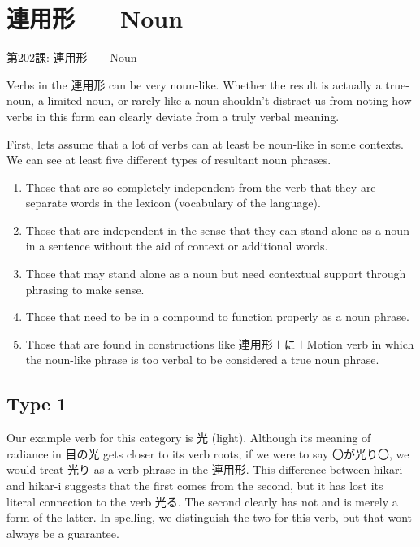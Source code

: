     
\chapter{連用形　\textrightarrow 　Noun}

\begin{center}
\begin{Large}
第202課: 連用形　\textrightarrow 　Noun 
\end{Large}
\end{center}
 
\par{ Verbs in the 連用形 can be very noun-like. Whether the result is actually a true-noun, a limited noun, or rarely like a noun shouldn't distract us from noting how verbs in this form can clearly deviate from a truly verbal meaning. }

\par{ First, let\textquotesingle s assume that a lot of verbs can at least be noun-like in some contexts. We can see at least five different types of resultant noun phrases. }

\begin{enumerate}

\item  Those that are so completely independent from the verb that they are separate words in the lexicon (vocabulary of the language). 
\item Those that are independent in the sense that they can stand alone as a noun in a sentence without the aid of context or additional words. \hfill\break

\item Those that may stand alone as a noun but need contextual support through phrasing to make sense. 
\item Those that need to be in a compound to function properly as a noun phrase. 
\item Those that are found in constructions like 連用形＋に＋Motion verb in which the noun-like phrase is too verbal to be considered a true noun phrase. 
\end{enumerate}
      
\section{Type 1}
 
\par{ Our example verb for this category is 光 (light). Although its meaning of radiance in 目の光 gets closer to its verb roots, if we were to say 〇が光り〇, we would treat 光り as a verb phrase in the 連用形. This difference between hikari and hikar-i suggests that the first comes from the second, but it has lost its literal connection to the verb 光る. The second clearly has not and is merely a form of the latter. In spelling, we distinguish the two for this verb, but that won\textquotesingle t always be a guarantee. }

